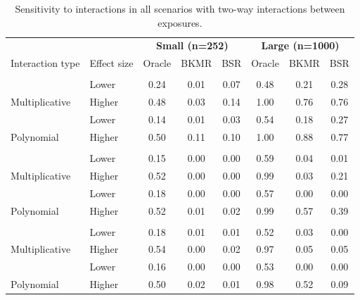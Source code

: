 \documentclass[12pt, twoside]{amherstthesis}
\begin{document}
\begin{table}

\caption{\label{tab:twowaytab}Sensitivity to interactions in all scenarios with two-way interactions between exposures.}
\centering
\begin{tabular}[t]{llcccccc}
\toprule
\multicolumn{2}{c}{\textbf{ }} & \multicolumn{3}{c}{\textbf{Small (n=252)}} & \multicolumn{3}{c}{\textbf{Large (n=1000)}} \\
\cmidrule(l{3pt}r{3pt}){3-5} \cmidrule(l{3pt}r{3pt}){6-8}
Interaction type & Effect size & Oracle & BKMR & BSR & Oracle & BKMR & BSR\\
\midrule
\addlinespace[0.3em]
\multicolumn{8}{l}{\textbf{Hg-Ni}}\\
 & Lower & 0.24 & 0.01 & 0.07 & 0.48 & 0.21 & 0.28\\

\multirow{-2}{*}{\raggedright\arraybackslash \hspace{1em}Multiplicative} & Higher & 0.48 & 0.03 & 0.14 & 1.00 & 0.76 & 0.76\\
\addlinespace
 & Lower & 0.14 & 0.01 & 0.03 & 0.54 & 0.18 & 0.27\\

\multirow{-2}{*}{\raggedright\arraybackslash \hspace{1em}Polynomial} & Higher & 0.50 & 0.11 & 0.10 & 1.00 & 0.88 & 0.77\\
\addlinespace
\addlinespace[0.3em]
\multicolumn{8}{l}{\textbf{Cd-As}}\\
 & Lower & 0.15 & 0.00 & 0.00 & 0.59 & 0.04 & 0.01\\

\multirow{-2}{*}{\raggedright\arraybackslash \hspace{1em}Multiplicative} & Higher & 0.52 & 0.00 & 0.00 & 0.99 & 0.03 & 0.21\\
\addlinespace
 & Lower & 0.18 & 0.00 & 0.00 & 0.57 & 0.00 & 0.00\\

\multirow{-2}{*}{\raggedright\arraybackslash \hspace{1em}Polynomial} & Higher & 0.52 & 0.01 & 0.02 & 0.99 & 0.57 & 0.39\\
\addlinespace
\addlinespace[0.3em]
\multicolumn{8}{l}{\textbf{Ni-Co}}\\
 & Lower & 0.18 & 0.01 & 0.01 & 0.52 & 0.03 & 0.00\\

\multirow{-2}{*}{\raggedright\arraybackslash \hspace{1em}Multiplicative} & Higher & 0.54 & 0.00 & 0.02 & 0.97 & 0.05 & 0.05\\
\addlinespace
 & Lower & 0.16 & 0.00 & 0.00 & 0.53 & 0.00 & 0.00\\

\multirow{-2}{*}{\raggedright\arraybackslash \hspace{1em}Polynomial} & Higher & 0.50 & 0.02 & 0.01 & 0.98 & 0.52 & 0.09\\
\bottomrule
\end{tabular}
\end{table}
\end{document}
